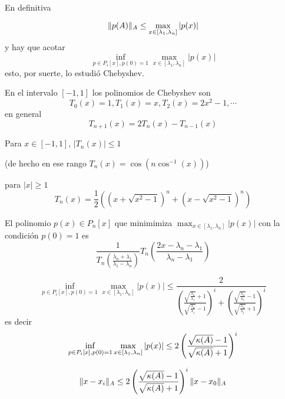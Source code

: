 En definitiva

$$
\|p(\Ab)\|_A\le  \max_{x\in [\lambda_1,\lambda_n]}|p(x)| 
$$
y hay que acotar
$$
\inf_{p\in P_i[x],p(0)=1}\max_{x\in [\lambda_1,\lambda_n]}|p(x)|
$$
esto, por suerte, lo estudió Chebyshev.

En el intervalo $[-1,1]$ los polinomios de Chebyshev son
$$
T_0(x)=1,T_1(x)=x,T_2(x)=2x^2-1,\cdots 
$$
en general
$$
T_{n+1}(x)=2T_{n}(x)-T_{n-1}(x)
$$

Para $x\in [-1,1]$, $|T_n(x)|\le 1$ 

(de hecho 
en ese rango $T_n(x)=\cos(n\cos^{-1}(x))$)

para $|x|\ge 1$
$$
T_n(x)=\frac12\left((x+\sqrt{x^2-1})^n+ (x-\sqrt{x^2-1})^n\right)
$$


El polinomio $p(x)\in P_n[x]$ que minimimiza $\max_{x\in [\lambda_1,\lambda_n]}|p(x)|$ con la condición $p(0)=1$ es
$$
\frac{1}{T_n(\frac{\lambda_n+\lambda_1}{\lambda_1-\lambda_n})}T_n\left(\frac{2x-\lambda_n-\lambda_1}{\lambda_n-\lambda_1}\right)$$


$$
\inf_{p\in P_i[x],p(0)=1}\max_{x\in [\lambda_1,\lambda_n]}|p(x)|
\le \frac{2}{\left( \frac{\sqrt{\frac{\lambda_n}{\lambda_1}}+1}{\sqrt{\frac{\lambda_n}{\lambda_1}}-1}\right)^i+\left( \frac{\sqrt{\frac{\lambda_n}{\lambda_1}}-1}{\sqrt{\frac{\lambda_n}{\lambda_1}}+1}\right)^i}$$ 
es decir
$$
\inf_{p\in P_i[x],p(0)=1}\max_{x\in [\lambda_1,\lambda_n]}|p(x)|
\le 2\left(\frac{\sqrt{\kappa(\Ab)}-1}{\sqrt{\kappa(\Ab)}+1}\right)^i
$$
 
$$\|\xb-\xb_i\|_{A}\le 2\left(\frac{\sqrt{\kappa(\Ab)}-1}{\sqrt{\kappa(\Ab)}+1}\right)^i\|\xb-\xb_0\|_{A}$$

 

